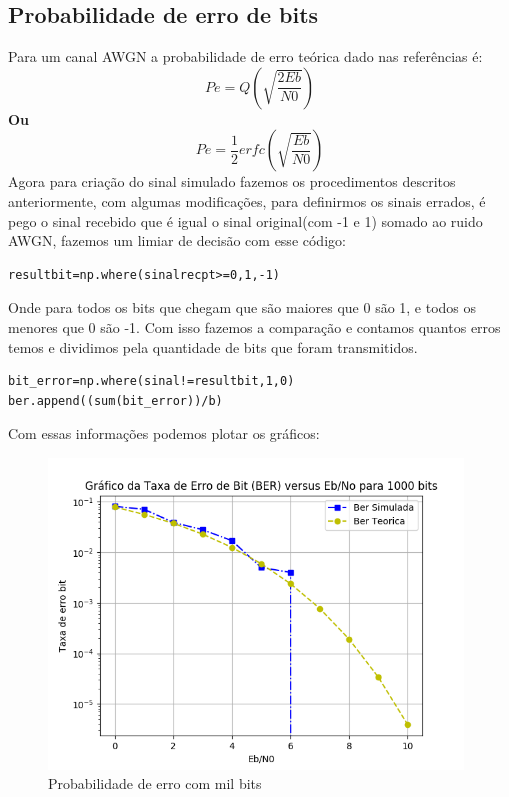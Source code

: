 \documentclass[12pt]{article}
\begin{document}
\subsection{Probabilidade de erro de bits}
Para um canal AWGN a probabilidade de erro teórica dado nas referências é:
\begin{equation}
    Pe=Q\left(\sqrt{\frac{2Eb}{N0}}\right)  
    
\end{equation}
\textbf{Ou} \begin{equation}
    Pe=\frac{1}{2}erfc \left(\sqrt{\frac{Eb}{N0}}\right)
    \end{equation}
Agora para criação do sinal simulado fazemos os procedimentos descritos anteriormente, com algumas modificações, para definirmos os sinais errados, é pego o sinal recebido que é igual o sinal original(com -1 e 1) somado ao ruido AWGN, fazemos um limiar de decisão com esse código:
\begin{lstlisting}
resultbit=np.where(sinalrecpt>=0,1,-1)
\end{lstlisting}
Onde para todos os bits que chegam que são maiores que 0 são 1, e todos os menores que 0 são -1. Com isso fazemos a comparação e contamos quantos erros temos e dividimos pela quantidade de bits que foram transmitidos.
\begin{lstlisting}
bit_error=np.where(sinal!=resultbit,1,0)            
ber.append((sum(bit_error))/b)
\end{lstlisting}
Com essas informações podemos plotar os gráficos:
\begin{figure}[h!]
\includegraphics[width=0.98\textwidth]{bermil.png}
    \caption{Probabilidade de erro com mil bits}
    \label{fig:my_label}
\end{figure}
\end{document}
